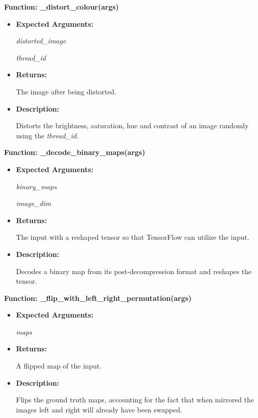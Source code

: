 \documentclass{scrreprt}
\begin{document}
\textbf{Function: \_distort\_colour(args)}
\begin{itemize}
    \item \textbf{Expected Arguments:}

            \quad\textit{distorted\_image}

            \quad\textit{thread\_id}

    \item \textbf{Returns:}

            The image after being distorted.

    \item \textbf{Description:}

            Distorts the brightness, saturation, hue and contrast of an image randomly using the \textit{thread\_id}. 
\end{itemize}

\textbf{Function: \_decode\_binary\_maps(args)}
\begin{itemize}
    \item \textbf{Expected Arguments:}

            \quad\textit{binary\_maps}

            \quad\textit{image\_dim}

    \item \textbf{Returns:}

            The input with a reshaped tensor so that TensorFlow can utilize the input.

    \item \textbf{Description:}

            Decodes a binary map from its post-decompression format and reshapes the tensor.

\end{itemize}

\textbf{Function: \_flip\_with\_left\_right\_permutation(args)}
\begin{itemize}
    \item \textbf{Expected Arguments:}

            \quad\textit{maps}

    \item \textbf{Returns:}

            A flipped map of the input.

    \item \textbf{Description:}

            Flips the ground truth maps, accounting for the fact that when mirrored the images left and right will already have been swapped.

\end{itemize}
\end{document}
